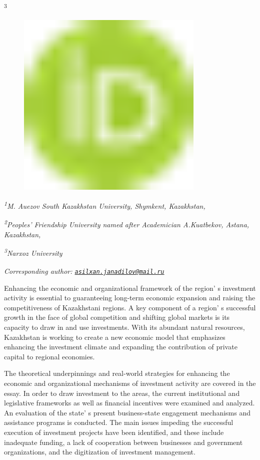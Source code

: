 \textsuperscript{3}
\begin{figure}[H]
	\centering
	\includegraphics[width=0.8\textwidth]{media/ekon2/image1}
	\caption*{}
\end{figure}


\emph{\textsuperscript{1}M. Auezov South Kazakhstan University,
Shymkent, Kazakhstan,}

\emph{\textsuperscript{2}Peoples'{} Friendship University
named after Academician A.Kuatbekov, Astana, Kazakhstan,}

\emph{\textsuperscript{3}Narxoz University}

\emph{{\bfseries \textsuperscript{\envelope }}Corresponding author:
\href{mailto:asilxan.janadilov@mail.ru}{\nolinkurl{asilxan.janadilov@mail.ru}}}

Enhancing the economic and organizational framework of the
region' s investment activity is essential to
guaranteeing long-term economic expansion and raising the
competitiveness of Kazakhstani regions. A key component of a
region' s successful growth in the face of global
competition and shifting global markets is its capacity to draw in and
use investments. With its abundant natural resources, Kazakhstan is
working to create a new economic model that emphasizes enhancing the
investment climate and expanding the contribution of private capital to
regional economies.

The theoretical underpinnings and real-world strategies for enhancing
the economic and organizational mechanisms of investment activity are
covered in the essay. In order to draw investment to the areas, the
current institutional and legislative frameworks as well as financial
incentives were examined and analyzed. An evaluation of the
state' s present business-state engagement mechanisms and
assistance programs is conducted. The main issues impeding the
successful execution of investment projects have been identified, and
these include inadequate funding, a lack of cooperation between
businesses and government organizations, and the digitization of
investment management.

